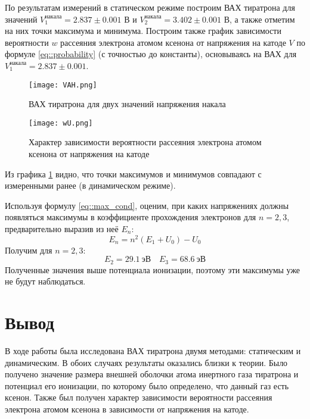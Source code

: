 По результатам измерений в статическом режиме построим ВАХ тиратрона для
значений $V_1^{накала} = 2.837 \pm 0.001$ В и $V_2^{накала} = 3.402 \pm 0.001$
В, а также отметим на них точки максимума и минимума. Построим также график
зависимости вероятности $w$ рассеяния электрона атомом ксенона от напряжения на
катоде $V$ по формуле \eqref{eq::probability} (с точностью до константы), основываясь на ВАХ для $V_1^{накала} =
2.837 \pm 0.001$.
\newpage
\begin{figure}[h!]
  \centering
  \texttt{[image: VAH.png]}
  \caption{ВАХ тиратрона для двух значений напряжения накала}
  \label{img::VAH}
\end{figure}
\begin{figure}[h!]
  \centering
  \texttt{[image: wU.png]}
  \caption{Характер зависимости вероятности рассеяния электрона атомом ксенона от напряжения на катоде}
\end{figure}

Из графика \ref{img::VAH} видно, что точки максимумов и минимумов совпадают с
измеренными ранее (в динамическом режиме).

Используя формулу \eqref{eq::max_cond}, оценим, при каких напряжениях должны
появляться максимумы в коэффициенте прохождения электронов для $n = 2, 3$,
предварительно выразив из неё $E_n$:
\[
  E_n = n^2 \left(E_1 + U_0\right) - U_0
\]
Получим для $n = 2, 3$:
\[
  E_2 = 29.1 \: \text{эВ} \quad
  E_3 = 68.6 \: \text{эВ}
\]
Полученные значения выше потенциала ионизации, поэтому эти максимумы уже не
будут наблюдаться.

\section{Вывод}

В ходе работы была исследована ВАХ тиратрона двумя методами: статическим и
динамическим. В обоих случаях результаты оказались близки к теории. Было
получено значение размера внешней оболочки атома инертного газа тиратрона и
потенциал его ионизации, по которому было определено, что данный газ есть
ксенон. Также был получен характер зависимости вероятности рассеяния электрона
атомом ксенона  в зависимости от напряжения на катоде.